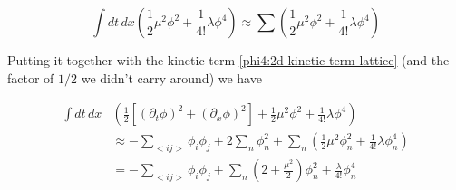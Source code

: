 $$
\int dt \, dx \left( \frac{1}{2} \mu^{2} \phi^2 + \frac{1}{4!} \lambda \phi^4 \right)
\approx \sum \left( \frac{1}{2} \mu^{2} \phi^2 + \frac{1}{4!} \lambda \phi^4 \right)
$$

Putting it together with the kinetic term \ref{phi4:2d-kinetic-term-lattice} (and the factor of $1/2$ we didn't carry around)
we have

\begin{equation}
\begin{split}
\int dt \, dx & \left(
    \frac{1}{2} \left[ \left( \partial_t \phi \right)^2 + \left( \partial_x \phi \right)^2 \right] + 
    \frac{1}{2} \mu^{2} \phi^2 + \frac{1}{4!} \lambda \phi^4
\right) \\
& \approx - \sum_{<ij>} \phi_i \phi_j + 2 \sum_n \phi^{2}_{n}
    + \sum_n \left( \frac{1}{2} \mu^{2} \phi^{2}_{n} + \frac{1}{4!} \lambda \phi^{4}_{n} \right) \\
&= - \sum_{<ij>} \phi_i \phi_j 
+ \sum_n \left( 2 + \frac{\mu^{2}}{2} \right) \phi^{2}_{n} + \frac{\lambda}{4!} \phi^{4}_{n} \label{phi4:2d-lattice-lagrangian}
\end{split}
\end{equation}
